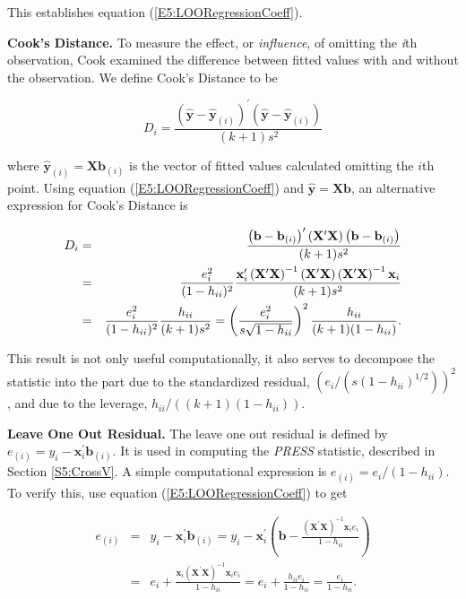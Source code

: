 \noindent This establishes equation (\ref{E5:LOORegressionCoeff}).

\textbf{Cook's Distance.} To measure the effect, or
\textit{influence}, of omitting the \textit{i}th observation, Cook
examined the difference between fitted values with and without the
observation. We define Cook's Distance to be
\begin{center}
\[
D_i=\frac{\left( \mathbf{\hat{y}-\hat{y}}_{(i)}\right)
^{\prime}\left( \mathbf{\hat{y}-\hat{y}}_{(i)}\right) }{(k+1)s^2}
\]
\end{center}
where $\mathbf{\hat{y}}_{(i)}=\mathbf{Xb}_{(i)}$ is the vector of
fitted values calculated omitting the $i$th point. Using equation
(\ref{E5:LOORegressionCoeff}) and $\mathbf{\hat{y}}=\mathbf{Xb}$, an
alternative expression for Cook's Distance is
\begin{center}
\begin{eqnarray*}
D_i &=&\frac{\left( \mathbf{b-b}_{(i)}\right) ^{\prime}\left( \mathbf{X}%
^{\prime}\mathbf{X}\right) \left( \mathbf{b-b}_{(i)}\right) }{(k+1)s^2} \\
&=&\frac{e_i^2}{(1-h_{ii})^2}\frac{\mathbf{x}_i^{\prime}\left(
\mathbf{X}^{\prime}\mathbf{X}\right) ^{-1} \left(
\mathbf{X}^{\prime}\mathbf{X}\right) \left(
\mathbf{X}^{\prime}\mathbf{X}\right) ^{-1}\mathbf{x}_i}{(k+1)s^2} \\
&=&\frac{e_i^2}{(1-h_{ii})^2}\frac{h_{ii}}{(k+1)s^2}=\left(
\frac{e_i^2}{s\sqrt{1-h_{ii}}}\right) ^2\frac{h_{ii}}{%
(k+1)(1-h_{ii})}.
\end{eqnarray*}
\end{center}
This result is not only useful computationally, it also serves to
decompose the statistic into the part due to the standardized
residual, $\left( e_i/\left( s\left( 1-h_{ii}\right) ^{1/2}\right)
\right) ^2$, and due to the leverage, $h_{ii}/\left( \left(
k+1\right) \left( 1-h_{ii}\right) \right) $.


\textbf{Leave One Out Residual.} The leave one out residual is defined by $%
e_{(i)}=y_i-\mathbf{x}_i^{\prime}\mathbf{b}_{(i)}$. It is used in
computing the \textit{PRESS} statistic, described in Section
\ref{S5:CrossV}. A simple computational expression is
$e_{(i)}=e_i/(1-h_{ii})$. To verify this, use equation
(\ref{E5:LOORegressionCoeff}) to get
\begin{center}
\begin{eqnarray*}
e_{(i)} &=&y_i-\mathbf{x}_i^{\prime}\mathbf{b}_{(i)}=y_i-%
\mathbf{x}_i^{\prime}\left( \mathbf{b}-\frac{\left( \mathbf{X}^{\prime}%
\mathbf{X}\right) ^{-1}\mathbf{x}_ie_i}{1-h_{ii}}\right)  \\
&=&e_i+\frac{\mathbf{x}_i\left( \mathbf{X}^{\prime}\mathbf{X}%
\right) ^{-1}\mathbf{x}_ie_i}{1-h_{ii}}=e_i+\frac{h_{ii}
e_i}{1-h_{ii}}=\frac{e_i}{1-h_{ii}}.
\end{eqnarray*}
\end{center}

